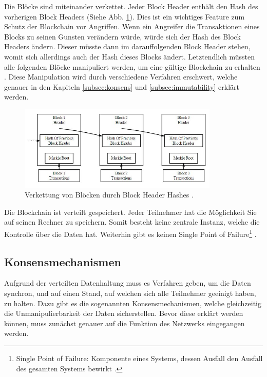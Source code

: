 Die Blöcke sind miteinander verkettet. Jeder Block Header enthält den Hash  des vorherigen Block Headers (Siehe Abb. \ref{fig:block-chain}). Dies ist ein wichtiges Feature zum Schutz der Blockchain vor Angriffen. Wenn ein Angreifer die Transaktionen eines Blocks zu seinen Gunsten verändern würde, würde sich der Hash des Block Headers ändern. Dieser müsste dann im darauffolgenden Block Header stehen, womit sich allerdings auch der Hash dieses Blocks ändert. Letztendlich müssten alle folgenden Blöcke manipuliert werden, um eine gültige Blockchain zu erhalten \cite{NakamotoBitcoinPeertoPeerElectronic2008}. Diese Manipulation wird durch verschiedene Verfahren erschwert, welche genauer in den Kapiteln \ref{subsec:konsens} und \ref{subsec:immutability} erklärt werden.

\begin{figure}[!htbp]
  \centering
	\includegraphics[width=0.85\textwidth,angle=0]{images/block-chain}
 	\caption{Verkettung von Blöcken durch Block Header Hashes \cite{RosicWhatHashingHood2017}.}
	\label{fig:block-chain}
\end{figure}

Die Blockchain ist verteilt gespeichert. Jeder Teilnehmer hat die Möglichkeit Sie auf seinen Rechner zu speichern. Somit besteht keine zentrale Instanz, welche die Kontrolle über die Daten hat. Weiterhin gibt es keinen Single Point of Failure\footnote{Single Point of Failure: Komponente eines Systems, dessen Ausfall den Ausfall des gesamten Systems bewirkt \cite{AntonopoulosMasteringbitcoin2015}.} \cite{CrosbyBlockChainTechnologyBitcoin2016}.

\label{subsec:konsens}
\subsection{Konsensmechanismen}
Aufgrund der verteilten Datenhaltung muss es Verfahren geben, um die Daten synchron, und auf einen Stand, auf welchen sich alle Teilnehmer geeinigt haben, zu halten. Dazu gibt es die sogenannten Konsensmechanismen, welche gleichzeitig die Unmanipulierbarkeit der Daten sicherstellen. Bevor diese erklärt werden können, muss zunächst genauer auf die Funktion des Netzwerks eingegangen werden.

